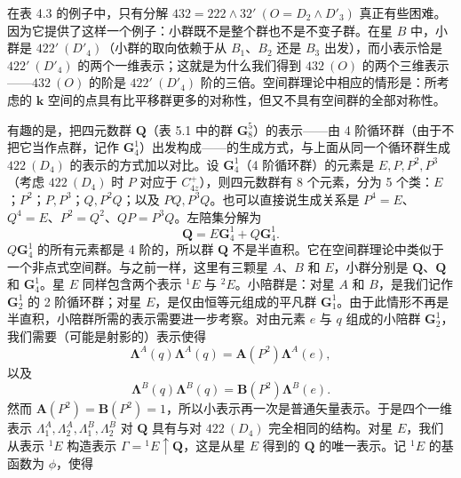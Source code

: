 在表 4.3 的例子中，只有分解 $432 = 222 \wedge 32'\ (O = D_{2} \wedge D'_{3})$ 真正有些困难。因为它提供了这样一个例子：小群既不是整个群也不是不变子群。在星 $B$ 中，小群是 $422'\ (D'_{4})$（小群的取向依赖于从 $B_{1}$、$B_{2}$ 还是 $B_{3}$ 出发），而小表示恰是 $422'\ (D'_{4})$ 的两个一维表示；这就是为什么我们得到 $432\ (O)$ 的两个三维表示——$432\ (O)$ 的阶是 $422'\ (D'_{4})$ 阶的三倍。空间群理论中相应的情形是：所考虑的 $\mathbf{k}$ 空间的点具有比平移群更多的对称性，但又不具有空间群的全部对称性。

有趣的是，把四元数群 $\mathbf{Q}$（表 5.1 中的群 $\mathbf{G}^{5}_{8}$）的表示——由 4 阶循环群（由于不把它当作点群，记作 $\mathbf{G}^{1}_{4}$）出发构成——的生成方式，与上面从同一个循环群生成 $422\ (D_{4})$ 的表示的方式加以对比。设 $\mathbf{G}^{1}_{4}$（4 阶循环群）的元素是 $E, P, P^{2}, P^{3}$（考虑 $422\ (D_{4})$ 时 $P$ 对应于 $C^{+}_{4z}$），则四元数群有 8 个元素，分为 5 个类：$E$；$P^{2}$；$P, P^{3}$；$Q, P^{2}Q$；以及 $PQ, P^{3}Q$。也可以直接说生成关系是 $P^{4} = E$、$Q^{4} = E$、$P^{2} = Q^{2}$、$QP = P^{3}Q$。左陪集分解为
\begin{equation*}
\mathbf{Q} = E\mathbf{G}^{1}_{4} + Q\mathbf{G}^{1}_{4}.
\tag{4.5.8}
\end{equation*}
$Q\mathbf{G}^{1}_{4}$ 的所有元素都是 4 阶的，所以群 $\mathbf{Q}$ 不是半直积。它在空间群理论中类似于一个非点式空间群。与之前一样，这里有三颗星 $A$、$B$ 和 $E$，小群分别是 $\mathbf{Q}$、$\mathbf{Q}$ 和 $\mathbf{G}^{1}_{4}$。星 $E$ 同样包含两个表示 ${}^{1}E$ 与 ${}^{2}E$。小陪群是：对星 $A$ 和 $B$，是我们记作 $\mathbf{G}^{1}_{2}$ 的 2 阶循环群；对星 $E$，是仅由恒等元组成的平凡群 $\mathbf{G}^{1}_{1}$。由于此情形不再是半直积，小陪群所需的表示需要进一步考察。对由元素 $e$ 与 $q$ 组成的小陪群 $\mathbf{G}^{1}_{2}$，我们需要（可能是射影的）表示使得
\begin{equation*}
\boldsymbol{\Lambda}^{A}(q)\boldsymbol{\Lambda}^{A}(q) = \mathbf{A}(P^{2})\boldsymbol{\Lambda}^{A}(e),
\tag{4.5.9}
\end{equation*}
以及
\begin{equation*}
\boldsymbol{\Lambda}^{B}(q)\boldsymbol{\Lambda}^{B}(q) = \mathbf{B}(P^{2})\boldsymbol{\Lambda}^{B}(e).
\tag{4.5.10}
\end{equation*}
然而 $\mathbf{A}(P^{2}) = \mathbf{B}(P^{2}) = 1$，所以小表示再一次是普通矢量表示。于是四个一维表示 $\Lambda^{A}_{1}, \Lambda^{A}_{2}, \Lambda^{B}_{1}, \Lambda^{B}_{2}$ 对 $\mathbf{Q}$ 具有与对 $422\ (D_{4})$ 完全相同的结构。对星 $E$，我们从表示 ${}^{1}E$ 构造表示 $\Gamma = {}^{1}E \uparrow \mathbf{Q}$，这是从星 $E$ 得到的 $\mathbf{Q}$ 的唯一表示。记 ${}^{1}E$ 的基函数为 $\phi$，使得
